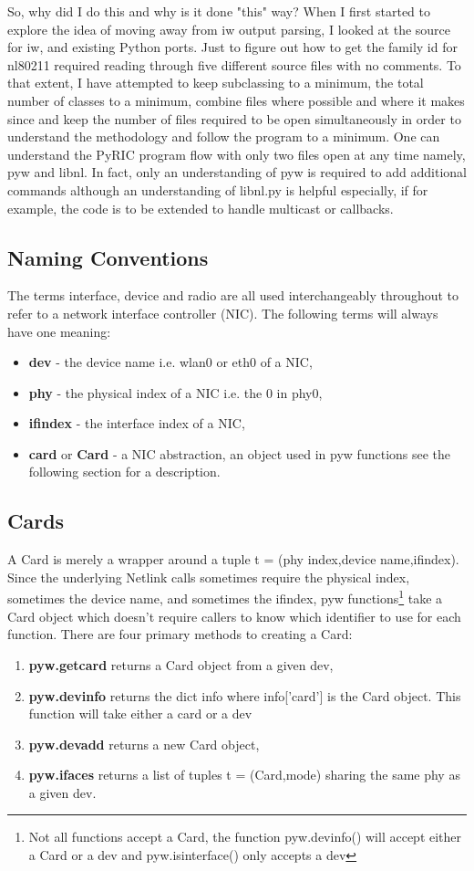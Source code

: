 \documentclass[11pt]{article}
\begin{document}
So, why did I do this and why is it done "this" way? When I first started to
explore the idea of moving away from iw output parsing, I looked at the source
for iw, and existing Python ports. Just to figure out how to get the family id
for nl80211 required reading through five different source files with no
comments. To that extent, I have attempted to keep subclassing to a minimum,
the total number of classes to a minimum, combine files where possible and where
it makes since and keep the number of files required to be open simultaneously
in order to understand the methodology and follow the program to a minimum. One
can understand the PyRIC program flow with only two files open at any time namely,
pyw and libnl. In fact, only an understanding of pyw is required to add additional
commands although an understanding of libnl.py is helpful especially, if for
example, the code is to be extended to handle multicast or callbacks.

\subsection{Naming Conventions}
The terms interface, device and radio are all used interchangeably throughout to 
refer to a network interface controller (NIC). The following terms will always
have one meaning:
\begin{itemize}
\item \textbf{dev} - the device name i.e. wlan0 or eth0 of a NIC, 
\item \textbf{phy} - the physical index of a NIC i.e. the 0 in phy0,
\item \textbf{ifindex} - the interface index of a NIC,
\item \textbf{card} or \textbf{Card} - a NIC abstraction, an object used in pyw 
functions see the following section for a description. 
\end{itemize}

\subsection{Cards}
A Card is merely a wrapper around a tuple t = (phy index,device name,ifindex). 
Since the underlying Netlink calls sometimes require the physical index, sometimes 
the device name, and sometimes the ifindex, pyw functions\footnote{Not all functions 
accept a Card, the function pyw.devinfo() will accept either a Card or a dev and 
pyw.isinterface() only accepts a dev} take a Card object which doesn't require
callers to know which identifier to use for each function. There are four primary methods to creating a Card: 
\begin{enumerate}
\item \textbf{pyw.getcard} returns a Card object from a given dev,
\item \textbf{pyw.devinfo} returns the dict info where info['card'] is the Card 
object. This function will take either a card or a dev
\item \textbf{pyw.devadd} returns a new Card object, 
\item \textbf{pyw.ifaces} returns a list of tuples t = (Card,mode) sharing the 
same phy as a given dev.
\end{enumerate}
\end{document}
